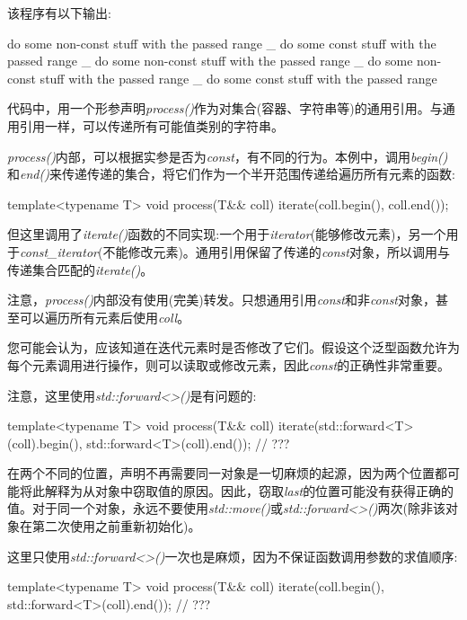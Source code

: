 该程序有以下输出:

\begin{shell}
do some non-const stuff with the passed range _
do some const stuff with the passed range _
do some non-const stuff with the passed range _
do some non-const stuff with the passed range _
do some const stuff with the passed range
\end{shell}

代码中，用一个形参声明\textit{process()}作为对集合(容器、字符串等)的通用引用。与通用引用一样，可以传递所有可能值类别的字符串。

\textit{process()}内部，可以根据实参是否为\textit{const}，有不同的行为。本例中，调用\textit{begin()}和\textit{end()}来传递传递的集合，将它们作为一个半开范围传递给遍历所有元素的函数:

\begin{cppcode}
template<typename T>
void process(T&& coll)
{
	iterate(coll.begin(), coll.end());
}
\end{cppcode}

但这里调用了\textit{iterate()}函数的不同实现:一个用于\textit{iterator}(能够修改元素)，另一个用于\textit{const_iterator}(不能修改元素)。通用引用保留了传递的\textit{const}对象，所以调用与传递集合匹配的\textit{iterate()}。

注意，\textit{process()}内部没有使用(完美)转发。只想通用引用\textit{const}和非\textit{const}对象，甚至可以遍历所有元素后使用\textit{coll}。

您可能会认为，应该知道在迭代元素时是否修改了它们。假设这个泛型函数允许为每个元素调用进行操作，则可以读取或修改元素，因此\textit{const}的正确性非常重要。

注意，这里使用\textit{std::forward<>()}是有问题的:

\begin{cppcode}
template<typename T>
void process(T&& coll)
{
	iterate(std::forward<T>(coll).begin(), std::forward<T>(coll).end()); // ???
}
\end{cppcode}

在两个不同的位置，声明不再需要同一对象是一切麻烦的起源，因为两个位置都可能将此解释为从对象中窃取值的原因。因此，窃取\textit{last}的位置可能没有获得正确的值。对于同一个对象，永远不要使用\textit{std::move()}或\textit{std::forward<>()}两次(除非该对象在第二次使用之前重新初始化)。

这里只使用\textit{std::forward<>()}一次也是麻烦，因为不保证函数调用参数的求值顺序:

\begin{cppcode}
template<typename T>
void process(T&& coll)
{
	iterate(coll.begin(), std::forward<T>(coll).end()); // ???
}
\end{cppcode}

